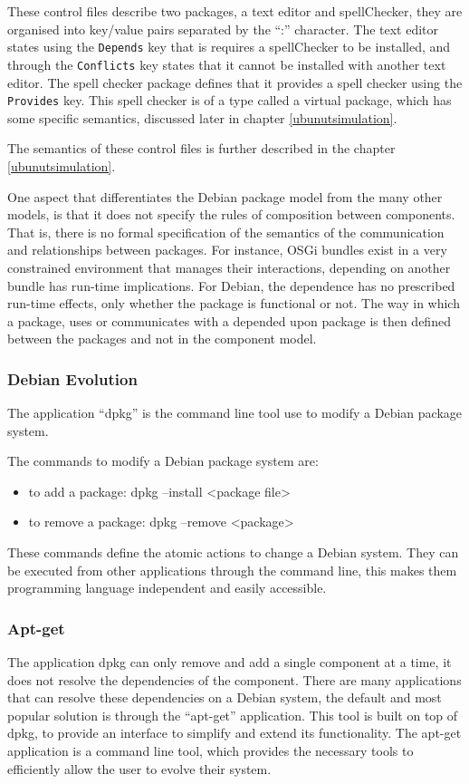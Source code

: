 These control files describe two packages, a text editor and spellChecker, they are organised into key/value pairs separated by the ``:'' character.
The text editor states using the \texttt{Depends} key that is requires a spellChecker to be installed, 
and through the \texttt{Conflicts} key states that it cannot be installed with another text editor.
The spell checker package defines that it provides a spell checker using the \texttt{Provides} key.
This spell checker is of a type called a virtual package, which has some specific semantics, discussed later in chapter \ref{ubunutsimulation}.

The semantics of these control files is further described in the chapter \ref{ubunutsimulation}.

One aspect that differentiates the Debian package model from the many other models, is that it does not specify the rules of composition between components.
That is, there is no formal specification of the semantics of the communication and relationships between packages.
For instance, OSGi bundles exist in a very constrained environment that manages their interactions, depending on another bundle has run-time implications.
For Debian, the dependence has no prescribed run-time effects, only whether the package is functional or not.
The way in which a package, uses or communicates with a depended upon package is then defined between the packages and not in the component model.

\subsubsection{Debian Evolution}
The application ``dpkg'' is the command line tool use to modify a Debian package system.

The commands to modify a Debian package system are:
\begin{itemize}
  \item to add a package: dpkg --install <package file>
  \item to remove a package: dpkg --remove <package>
\end{itemize}

These commands define the atomic actions to change a Debian system.
They can be executed from other applications through the command line, this makes them programming language independent and easily accessible. 

\subsubsection{Apt-get}
The application dpkg can only remove and add a single component at a time, it does not resolve the dependencies of the component.
There are many applications that can resolve these dependencies on a Debian system, the default and most popular solution is through the ``apt-get'' application.
This tool is built on top of dpkg, to provide an interface to simplify and extend its functionality.
The apt-get application is a command line tool, which provides the necessary tools to efficiently allow the user to evolve their system.

